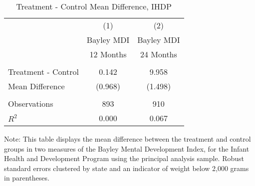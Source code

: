 \begin{table}[H] 
\begin{threeparttable}
\caption{Treatment - Control Mean Difference, IHDP}
\label{table:ihdp}
\centering 
\begin{tabular}{lcc} \toprule
 & (1) & (2) \\
 & Bayley MDI & Bayley MDI \\ 
 & 12 Months & 24 Months \\ \midrule
 &  &  \\
Treatment - Control & 0.142 & 9.958 \\
Mean Difference & (0.968) & (1.498) \\
 &  &  \\ \midrule
Observations & 893 & 910 \\
$R^2$ & 0.000 & 0.067 \\ \midrule
\end{tabular}
\begin{tablenotes}
\footnotesize
\item Note: This table displays the mean difference between the treatment and control groups in two measures of the Bayley Mental Development Index, for the Infant Health and Development Program using the principal analysis sample. Robust standard errors clustered by state and an indicator of weight below 2,000 grams in parentheses.
\end{tablenotes}
\end{threeparttable}
\end{table}
